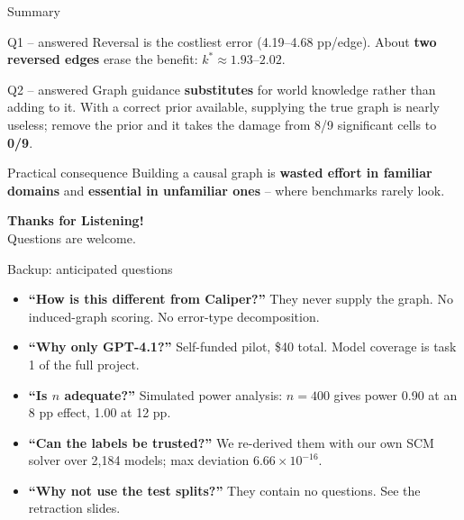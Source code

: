 \documentclass{beamer}
\begin{document}
\begin{frame}{Summary}
  \begin{block}{Q1 -- answered}
    Reversal is the costliest error (4.19--4.68 pp/edge). About
    \textbf{two reversed edges} erase the benefit: $k^* \approx 1.93$--$2.02$.
  \end{block}

  \begin{block}{Q2 -- answered}
    Graph guidance \textbf{substitutes} for world knowledge rather than adding
    to it. With a correct prior available, supplying the true graph is nearly
    useless; remove the prior and it takes the damage from 8/9 significant
    cells to \textbf{0/9}.
  \end{block}

  \begin{block}{Practical consequence}
    Building a causal graph is \textbf{wasted effort in familiar domains} and
    \textbf{essential in unfamiliar ones} -- where benchmarks rarely look.
  \end{block}
\end{frame}

\begin{frame}[plain]
    \centering
    \vfill
    {\Huge \textbf{Thanks for Listening!}} \\[1em]
    {\large Questions are welcome.}
    \vfill
\end{frame}

\appendix

\begin{frame}{Backup: anticipated questions}
  \begin{itemize}
    \item \textbf{``How is this different from Caliper?''} They never supply the
      graph. No induced-graph scoring. No error-type decomposition.
    \item \textbf{``Why only GPT-4.1?''} Self-funded pilot, \$40 total.
      Model coverage is task 1 of the full project.
    \item \textbf{``Is $n$ adequate?''} Simulated power analysis:
      $n{=}400$ gives power 0.90 at an 8 pp effect, 1.00 at 12 pp.
    \item \textbf{``Can the labels be trusted?''} We re-derived them with our own
      SCM solver over 2{,}184 models; max deviation $6.66\times10^{-16}$.
    \item \textbf{``Why not use the test splits?''} They contain no questions.
      See the retraction slides.
  \end{itemize}
\end{frame}
\end{document}
